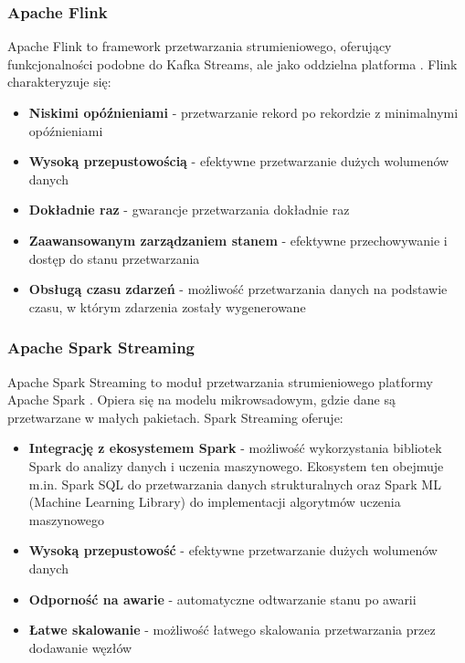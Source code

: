\subsubsection{Apache Flink}
\label{subsubsec:apache_flink}

Apache Flink to framework przetwarzania strumieniowego, oferujący funkcjonalności podobne do Kafka Streams,
ale jako oddzielna platforma \citep{flink}. Flink charakteryzuje się:

\begin{itemize}
    \item \textbf{Niskimi opóźnieniami} - przetwarzanie rekord po rekordzie z minimalnymi opóźnieniami
    \item \textbf{Wysoką przepustowością} - efektywne przetwarzanie dużych wolumenów danych
    \item \textbf{Dokładnie raz} - gwarancje przetwarzania dokładnie raz
    \item \textbf{Zaawansowanym zarządzaniem stanem} - efektywne przechowywanie i dostęp do stanu przetwarzania
    \item \textbf{Obsługą czasu zdarzeń} - możliwość przetwarzania danych na podstawie czasu, w którym zdarzenia zostały wygenerowane
\end{itemize}

\subsubsection{Apache Spark Streaming}
\label{subsubsec:spark_streaming}

Apache Spark Streaming to moduł przetwarzania strumieniowego platformy Apache Spark \citep{spark_streaming}.
Opiera się na modelu mikrowsadowym, gdzie dane są przetwarzane w małych pakietach. Spark Streaming oferuje:

\begin{itemize}
    \item \textbf{Integrację z ekosystemem Spark} - możliwość wykorzystania bibliotek Spark do analizy danych i uczenia maszynowego. Ekosystem ten obejmuje m.in. Spark SQL do przetwarzania danych strukturalnych oraz Spark ML (Machine Learning Library) do implementacji algorytmów uczenia maszynowego
    \item \textbf{Wysoką przepustowość} - efektywne przetwarzanie dużych wolumenów danych
    \item \textbf{Odporność na awarie} - automatyczne odtwarzanie stanu po awarii
    \item \textbf{Łatwe skalowanie} - możliwość łatwego skalowania przetwarzania przez dodawanie węzłów
\end{itemize}

